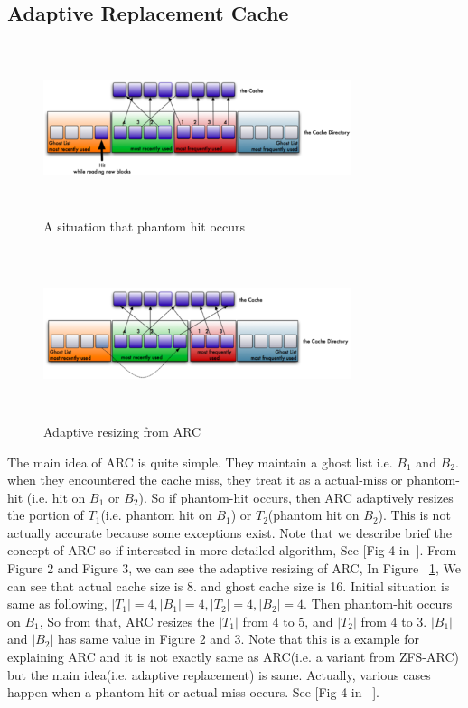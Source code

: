 \subsection{Adaptive Replacement Cache}


\begin{figure}[t]
 \centering
 \includegraphics[width=9cm,height=5cm]{Figures/phantom_cache_hit.PNG}
 \captionsetup[figure]{font=normalsize}
 \caption{A situation that phantom hit occurs}
 \vspace{-0.5cm}
 \label{fig:phantom_hit}
\end{figure}


\begin{figure}[t]
 \centering
 \includegraphics[width=9cm,height=5cm]{Figures/phantom_cache_hit_after.png}
 \captionsetup[figure]{font=normalsize}
 \caption{Adaptive resizing from ARC}
 \vspace{-0.5cm}
 \label{fig:phatom_hit_after}
\end{figure}


The main idea of ARC is quite simple. They maintain a ghost list i.e. $B_1$ and $B_2$.  when they encountered the cache miss, they treat it as a actual-miss or phantom-hit (i.e. hit on $B_1$ or $B_2$). So if phantom-hit occurs, then ARC adaptively resizes the portion of $T_1$(i.e. phantom hit on $B_1$) or $T_2$(phantom hit on $B_2$). This is not actually accurate because some exceptions exist. Note that we describe brief the concept of ARC so if interested in 
more detailed algorithm, See [Fig 4 in~\cite{arc}]. From Figure 2 and Figure 3, we can see the adaptive resizing of ARC, In Figure ~\ref{fig:phantom_hit}, We can see that actual cache size is 8. and ghost cache size is 16. Initial situation is same as following, $|T_1|=4, |B_1|=4, |T_2|=4, |B_2|=4$. Then phantom-hit occurs on $B_1$, So from that, ARC resizes the $|T_1|$ from $4$ to $5$, and $|T_2|$ from $4$ to $3$. $|B_1|$ and $|B_2|$ has same value in Figure 2 and 3. Note that this is a example for explaining ARC and it is not exactly same as ARC(i.e. a variant from ZFS-ARC) but the main idea(i.e. adaptive replacement) is same. Actually, various cases happen when a phantom-hit or actual miss occurs. See [Fig 4 in ~\cite{arc}]. 

